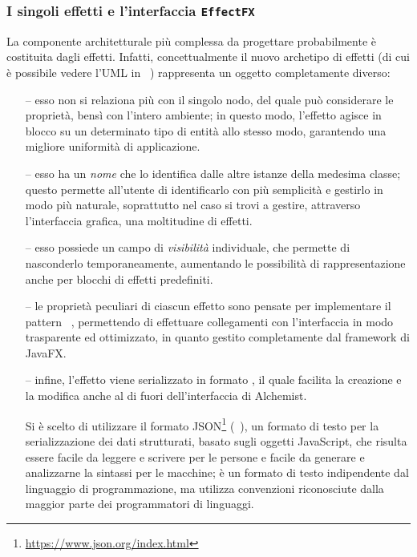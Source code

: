             \subsubsection{I singoli effetti e l'interfaccia \texttt{EffectFX}}\label{subsub:effectFX}
                La componente architetturale più complessa da progettare probabilmente è costituita dagli effetti.
                Infatti, concettualmente il nuovo archetipo di effetti (di cui è possibile vedere l'UML in~%
                ) rappresenta un oggetto completamente diverso:

                \begin{itemize}
                    \item[--]\label{itm:eFXEnv} esso non si relaziona più con il singolo nodo, del quale può considerare le proprietà, bensì con l'intero ambiente; in questo modo, l'effetto agisce in blocco su un determinato tipo di entità allo stesso modo, garantendo una migliore uniformità di applicazione.

                    \item[--]\label{itm:eFXName} esso ha un \emph{nome} che lo identifica dalle altre istanze della medesima classe; questo permette all'utente di identificarlo con più semplicità e gestirlo in modo più naturale, soprattutto nel caso si trovi a gestire, attraverso l’interfaccia grafica, una moltitudine di effetti.

                    \item[--]\label{itm:eFXVis} esso possiede un campo di \emph{visibilità} individuale, che permette di nasconderlo temporaneamente, aumentando le possibilità di rappresentazione anche per blocchi di effetti predefiniti.

                    \item[--]\label{itm:eFXobservable} le proprietà peculiari di ciascun effetto sono pensate per implementare il pattern ~\cite{observer}, permettendo di effettuare collegamenti con l'interfaccia in modo trasparente ed ottimizzato, in quanto gestito completamente dal framework di JavaFX.

                    \item[--]\label{itm:eFXjson} infine, l'effetto viene serializzato in formato , il quale facilita la creazione e la modifica anche al di fuori dell'interfaccia di Alchemist.

                    Si è scelto di utilizzare il formato JSON\footnote{\url{https://www.json.org/index.html}} (~\cite{json}), un formato di testo per la serializzazione dei dati strutturati, basato sugli oggetti JavaScript, che risulta essere facile da leggere e scrivere per le persone e facile da generare e analizzarne la sintassi per le macchine; è un formato di testo indipendente dal linguaggio di programmazione, ma utilizza convenzioni riconosciute dalla maggior parte dei programmatori di linguaggi.

                \end{itemize}

